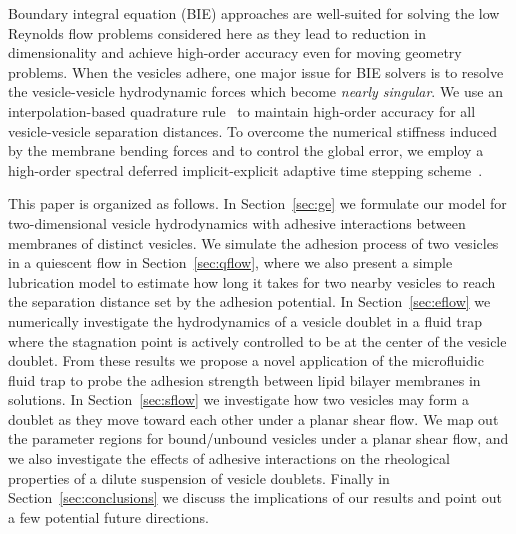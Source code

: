 \documentclass[prf,superscriptaddress,showpacs]{revtex4-1}
\begin{document}
Boundary integral equation (BIE) approaches are well-suited for solving
the low Reynolds flow problems considered here as they lead to reduction
in dimensionality and achieve high-order accuracy even for moving
geometry problems. When the vesicles adhere, one major issue for BIE solvers is to resolve the vesicle-vesicle hydrodynamic forces which become {\em nearly singular}. 
We use an interpolation-based quadrature rule~\cite{qua-bir2014} to maintain
high-order accuracy for all vesicle-vesicle separation distances.  To
overcome the numerical stiffness induced by the membrane bending forces
and to control the global error, we employ a high-order spectral
deferred implicit-explicit adaptive time stepping
scheme~\cite{quaife2016adaptive}. 

This paper is organized as follows. In Section~\ref{sec:ge} we formulate
our model for two-dimensional vesicle hydrodynamics with adhesive
interactions between membranes of distinct vesicles.  We simulate the
adhesion process of two vesicles in a quiescent flow in
Section~\ref{sec:qflow}, where we also present a simple lubrication model to
estimate how long it takes for two nearby vesicles to reach the
separation distance set by the adhesion potential.
In Section~\ref{sec:eflow} we
numerically investigate the hydrodynamics of a vesicle doublet in a
fluid trap where the stagnation point is actively controlled to be at
the center of the vesicle doublet. From these results we propose a novel
application of the microfluidic fluid trap to probe the adhesion
strength between lipid bilayer membranes in solutions. In
Section~\ref{sec:sflow} we investigate how two vesicles may form a
doublet as they move toward each other under a planar shear flow.  We
map out the parameter regions for bound/unbound vesicles under a planar
shear flow, and we also investigate the effects of adhesive interactions
on the rheological properties of a dilute suspension of vesicle
doublets.  Finally in Section~\ref{sec:conclusions} we discuss the
implications of our results and point out a few potential future
directions.



\end{document}
